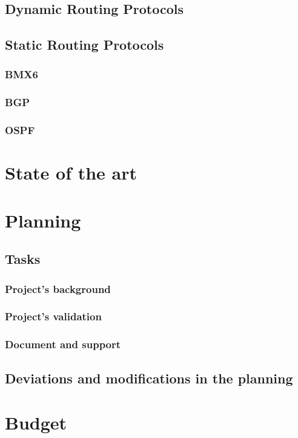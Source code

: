 \subsection{Dynamic Routing Protocols}
\label{subsec:drp}


\subsection{Static Routing Protocols}
\label{subsec:srp}


\subsubsection{BMX6}
\label{subsec:bmx}



\subsubsection{BGP}
\label{subsubsec:BADV}


\subsubsection{OSPF}


\section{State of the art}
\label{sec:soa}


\section{Planning}
\label{sec:tp}


\subsection{Tasks}


\subsubsection{Project's background}


\subsubsection{Project's validation}


\subsubsection{Document and support}



\subsection{Deviations and modifications in the planning}


\section{Budget} 

